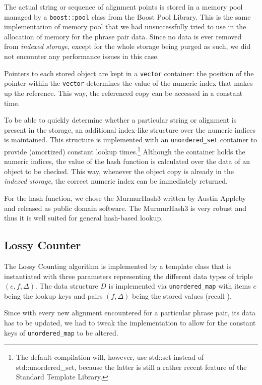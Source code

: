 The actual string or sequence of alignment points is stored in a memory pool managed by
a \texttt{boost::pool} class from the Boost Pool Library.
This is the same implementation of memory pool that we had unsuccessfully tried to use
in the allocation of memory for the phrase pair data.
Since no data is ever removed from \emph{indexed storage}, except for the whole storage
being purged as such, we did not encounter any performance issues in this case.

Pointers to each stored object are kept in a \texttt{vector} container: the position of
the pointer within the \texttt{vector} determines the value of the numeric index that
makes up the reference. This way, the referenced copy can be accessed in a constant time.

To be able to quickly determine whether a particular string or alignment is present
in the storage, an additional index-like structure over the numeric indices is maintained.
This structure is implemented with an \texttt{unordered_set} container to provide
(amortized) constant lookup times.\footnote{The default \eppex{} compilation will, however,
use std::set instead of std::unordered_set, because the latter is still a rather recent
feature of the Standard Template Library.}
Although the container holds the numeric indices, the value of the hash function is calculated
over the data of an object to be checked. This way, whenever the object copy is already in
the \emph{indexed storage}, the correct numeric index can be immediately returned.

For the hash function, we chose the MurmurHash3 written by Austin Appleby and released as
public domain software.
The MurmurHash3 is very robust and thus it is well suited for general hash-based lookup.

\subsection{Lossy Counter}

The Lossy Counting algorithm is implemented by a template class that is instantiated with
three parameters representing the different data types of triple $(e, f, \Delta)$.
The data structure $D$ is implemented via \texttt{unordered_map} with items $e$ being
the lookup keys and pairs $(f, \Delta)$ being the stored values (recall ).

Since with every new alignment encountered for a particular phrase pair, its data has to
be updated, we had to tweak the implementation to allow for the constant keys of
\texttt{unordered_map} to be altered.

